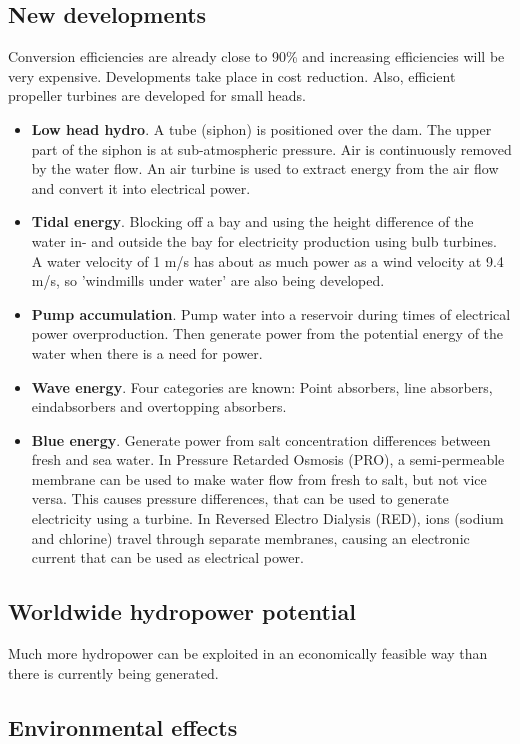 \documentclass[a4paper,10pt]{article}
\begin{document}
\subsection{New developments}
Conversion efficiencies are already close to 90\% and increasing efficiencies will be very expensive. Developments take place in cost reduction. Also, efficient propeller turbines are developed for small heads.
\begin{itemize}
\item \textbf{Low head hydro}. A tube (siphon) is positioned over the dam. The upper part of the siphon is at sub-atmospheric pressure. Air is continuously removed by the water flow. An air turbine is used to extract energy from the air flow and convert it into electrical power.
\item \textbf{Tidal energy}. Blocking off a bay and using the height difference of the water in- and outside the bay for electricity production using bulb turbines. A water velocity of 1 m/s has about as much power as a wind velocity at 9.4 m/s, so 'windmills under water' are also being developed.
\item \textbf{Pump accumulation}. Pump water into a reservoir during times of electrical power overproduction. Then generate power from the potential energy of the water when there is a need for power.
\item \textbf{Wave energy}. Four categories are known: Point absorbers, line absorbers, eindabsorbers and overtopping absorbers.
\item \textbf{Blue energy}. Generate power from salt concentration differences between fresh and sea water. In Pressure Retarded Osmosis (PRO), a semi-permeable membrane can be used to make water flow from fresh to salt, but not vice versa. This causes pressure differences, that can be used to generate electricity using a turbine. In Reversed Electro Dialysis (RED), ions (sodium and chlorine) travel through separate membranes, causing an electronic current that can be used as electrical power.
\end{itemize}

\subsection{Worldwide hydropower potential}
Much more hydropower can be exploited in an economically feasible way than there is currently being generated.

\subsection{Environmental effects}
\end{document}
